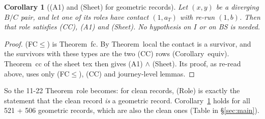 \documentclass[11pt]{article}
\newtheorem{corollary}[theorem]{Corollary}
\theoremstyle{definition}\newtheorem{definition}[theorem]{Definition}\newtheorem{remark}[theorem]{Remark}
\begin{document}
\begin{corollary}[(A1) and (Sheet) for geometric records]\label{cor:geo}
Let $(x,y)$ be a diverging $B/C$ pair, and let one of its roles have contact $(1,a_T)$ with re-run $(1,b)$. Then that role satisfies (CC), (A1) and (Sheet). No hypothesis on $I$ or on BS is needed.
\end{corollary}
\begin{proof}
(FC$\le$) is Theorem~fc. By Theorem~local the contact is a survivor, and the survivors with these types are the two (CC) rows (Corollary~equiv). Theorem~cc of the sheet tex then gives (A1) $\wedge$ (Sheet). Its proof, as re-read above, uses only (FC$\le$), (CC) and journey-level lemmas.
\end{proof}
\noindent So the 11-22 Theorem~role becomes: for clean records, (Role) is exactly the statement that the clean record \emph{is} a geometric record. Corollary~\ref{cor:geo} holds for all 521 + 506 geometric records, which are also the clean ones (Table in \S\ref{sec:main}).
\end{document}
